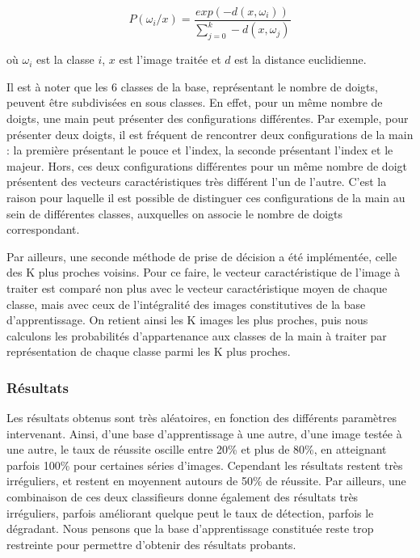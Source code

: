 \[
P(\omega_i / x) = \frac{exp(-d(x, \omega_i))}{\sum_{j=0}^{k}-d(x, \omega_j)}
\]

où $\omega_i$ est la classe $i$, $x$ est l'image traitée et $d$ est la distance euclidienne.

Il est à noter que les 6 classes de la base, représentant le nombre de doigts, peuvent être subdivisées en sous classes. En effet, pour un même nombre de doigts, une main peut présenter des configurations différentes. Par exemple, pour présenter deux doigts, il est fréquent de rencontrer deux configurations de la main : la première présentant le pouce et l'index, la seconde présentant l'index et le majeur. Hors, ces deux configurations différentes pour un même nombre de doigt présentent des vecteurs caractéristiques très différent l'un de l'autre. C'est la raison pour laquelle il est possible de distinguer ces configurations de la main au sein de différentes classes, auxquelles on associe le nombre de doigts correspondant.

	Par ailleurs, une seconde méthode de prise de décision a été implémentée, celle des K plus proches voisins. Pour ce faire, le vecteur caractéristique de l'image à traiter est comparé non plus avec le vecteur caractéristique moyen de chaque classe, mais avec ceux de l'intégralité des images constitutives de la base d'apprentissage. On retient ainsi les K images les plus proches, puis nous calculons les probabilités d'appartenance aux classes de la main à traiter par représentation de chaque classe parmi les K plus proches.

\subsubsection{Résultats}

Les résultats obtenus sont très aléatoires, en fonction des différents paramètres intervenant. Ainsi, d'une base d'apprentissage à une autre, d'une image testée à une autre, le taux de réussite oscille entre 20\% et plus de 80\%, en atteignant parfois 100\% pour certaines séries d'images. Cependant les résultats restent très irréguliers, et restent en moyennent autours de 50\% de réussite. Par ailleurs, une combinaison de ces deux classifieurs donne également des résultats très irréguliers, parfois améliorant quelque peut le taux de détection, parfois le dégradant. Nous pensons que la base d'apprentissage constituée reste trop restreinte pour permettre d'obtenir des résultats probants. 

